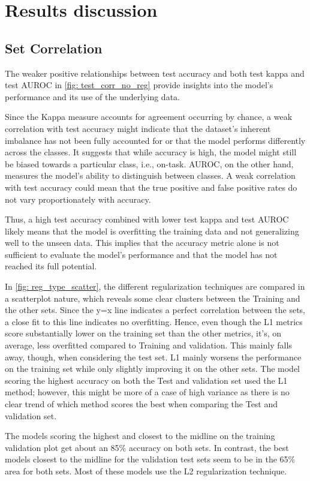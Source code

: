 \section{Results discussion}
\subsection{Set Correlation}
The weaker positive relationships between test accuracy and both test kappa and test AUROC in \autoref{fig: test_corr_no_reg} provide insights into the model's performance and its use of the underlying data.

Since the Kappa measure accounts for agreement occurring by chance, a weak correlation with test accuracy might indicate that the dataset's inherent imbalance has not been fully accounted for or that the model performs differently across the classes. It suggests that while accuracy is high, the model might still be biased towards a particular class, i.e., on-task.
AUROC, on the other hand, measures the model's ability to distinguish between classes. A weak correlation with test accuracy could mean that the true positive and false positive rates do not vary proportionately with accuracy.

Thus, a high test accuracy combined with lower test kappa and test AUROC likely means that the model is overfitting the training data and not generalizing well to the unseen data. This implies that the accuracy metric alone is not sufficient to evaluate the model's performance and that the model has not reached its full potential.

In \autoref{fig: reg_type_scatter}, the different regularization techniques are compared in a scatterplot nature, which reveals some clear clusters between the Training and the other sets. Since the y=x line indicates a perfect correlation between the sets, a close fit to this line indicates no overfitting. Hence, even though the L1 metrics score substantially lower on the training set than the other metrics, it's, on average, less overfitted compared to Training and validation. This mainly falls away, though, when considering the test set. L1 mainly worsens the performance on the training set while only slightly improving it on the other sets. The model scoring the highest accuracy on both the Test and validation set used the L1 method; however, this might be more of a case of high variance as there is no clear trend of which method scores the best when comparing the Test and validation set.

The models scoring the highest and closest to the midline on the training validation plot get about an 85\% accuracy on both sets. In contrast, the best models closest to the midline for the validation test sets seem to be in the 65\% area for both sets. Most of these models use the L2 regularization technique.

